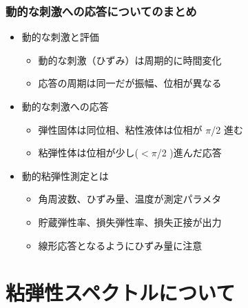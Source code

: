 \documentclass[12pt, dvipdfmx]{beamer}
\begin{document}
\begin{frame}
	\frametitle{動的な刺激への応答についてのまとめ}
        \begin{boxnote}
            \vspace{-3mm}
            \begin{itemize}
                \item 動的な刺激と評価
                    \begin{itemize}
                        \item 動的な刺激（ひずみ）は周期的に時間変化
                        \item 応答の周期は同一だが振幅、位相が異なる
                    \end{itemize} 
                \item 動的な刺激への応答
                    \begin{itemize}
                        \item 弾性固体は同位相、粘性液体は位相が $\pi$/2 進む
                        \item 粘弾性体は位相が少し($<\pi$/2 )進んだ応答
                    \end{itemize} 
                \item 動的粘弾性測定とは
                    \begin{itemize}
                        \item 角周波数、ひずみ量、温度が測定パラメタ
                        \item 貯蔵弾性率、損失弾性率、損失正接が出力
                        \item 線形応答となるようにひずみ量に注意
                    \end{itemize}
            \end{itemize}
        \end{boxnote}
\end{frame}

\section{粘弾性スペクトルについて}
\end{document}
